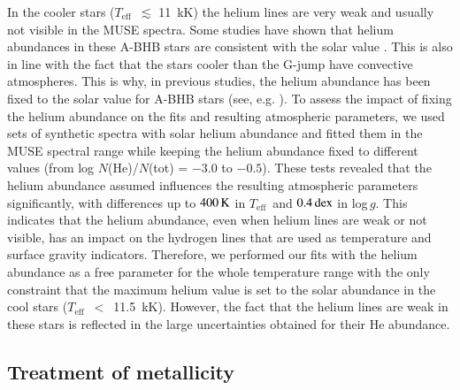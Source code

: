 \documentclass{aa}
\newcommand{\teff}{$T_{\text{eff}}$}
\begin{document}
In the cooler stars (\teff~$\lesssim$ 11~kK) the helium lines are very weak and usually not visible in the MUSE spectra. Some studies have shown that helium abundances in these A-BHB stars are consistent with the solar value \citep{adelman96,kinman00,behr03,2009A&A...499..755V,2012ApJ...748...62V,2014MNRAS.437.1609M}. This is also in line with the fact that the stars cooler than the G-jump have convective atmospheres.
This is why, in previous studies, the helium abundance has been fixed to the solar value for A-BHB stars (see, e.g. \citealt{monibidin2007}). 
To assess the impact of fixing the helium abundance on the fits and resulting atmospheric parameters, we used sets of synthetic spectra 
with solar helium abundance and fitted them in the MUSE spectral range while keeping the helium abundance fixed to different values (from log $N$(He)/$N$(tot) = $-3.0$ to $-0.5$).
These tests revealed that the helium abundance assumed influences the resulting atmospheric parameters significantly, with differences up to $400\,\rm K$ in \teff\ and $0.4\,\rm dex$ in log\,$g$.
This indicates that the helium abundance, even when helium lines are weak or not visible, has an impact on the hydrogen lines that are used as temperature and surface gravity indicators. Therefore, we performed our fits with the helium abundance as a free parameter for the whole temperature range with the only constraint that the maximum helium value is set to the solar abundance in the cool stars (\teff~$<$~11.5~kK).
However, the fact that the helium lines are weak in these stars is reflected in the large uncertainties obtained for their He abundance.


\subsection{Treatment of metallicity}\label{subsec:metal}
\end{document}
